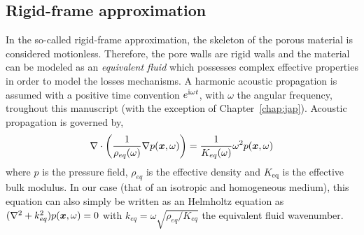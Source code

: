    \subsection{Rigid-frame approximation}
In the so-called rigid-frame approximation, the skeleton of the porous material is considered motionless. Therefore, the pore walls are rigid walls and the material can be modeled as an \emph{equivalent fluid} which possesses complex effective properties in order to model the losses mechanisms. A harmonic acoustic propagation is assumed with a positive time convention $e^{\mathrm i \omega t}$, with $\omega$ the angular frequency, troughout this manuscript (with the exception of Chapter~\ref{chap:jap}). Acoustic propagation is governed by,
\begin{equation}
    \nabla \cdot \left( \frac 1 {\rho_{eq}(\omega)} \nabla p (\boldsymbol x, \omega)\right) = \frac 1 {K_{eq}(\omega)} \omega^2 p(\boldsymbol x, \omega)
    \label{eq:chap1_helmholtz}
\end{equation}
where $p$ is the pressure field, $\rho_{eq}$ is the effective density and $K_{\text{eq}}$ is the effective bulk modulus. In our case (that of an isotropic and homogeneous medium), this equation can also simply be written as an Helmholtz equation as $(\nabla^2 + k_{eq}^2)p(\boldsymbol x, \omega) = 0$ with $k_{eq} = \omega \sqrt{\rho_{eq}/K_{eq}}$ the equivalent fluid wavenumber. 

